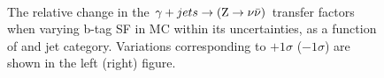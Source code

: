 \begin{figure}[!h]
  \centering
   ~~
  \\

  \caption{\label{fig:tfSyst_bsf_gjToZinv} The relative change in the
  $\gamma + jets \rightarrow ({\text Z} \rightarrow \nu\bar{\nu})$ transfer
  factors when varying b-tag SF in MC within its uncertainties, as a function of \scalht and jet category. 
  Variations corresponding to $+1\sigma$ ($-1\sigma$) are shown in the left (right) figure. 
  }
\end{figure}

